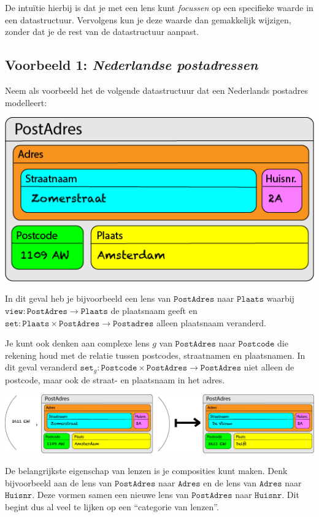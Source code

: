 \documentclass{article}
\newcommand{\PostAdres}[0]{\mathtt{PostAdres}}
\newcommand{\Adres}[0]{\mathtt{Adres}}
\newcommand{\Huisnr}[0]{\mathtt{Huisnr}}
\begin{document}
De intuïtie hierbij is dat je met een lens kunt \emph{focussen} op een specifieke waarde in een datastructuur. Vervolgens kun je deze waarde dan gemakkelijk wijzigen, zonder dat je de rest van de datastructuur aanpast.

\subsection*{Voorbeeld 1: \emph{Nederlandse postadressen}}

Neem als voorbeeld het de volgende datastructuur dat een Nederlands postadres modelleert:

\includegraphics[width=0.5\linewidth]{datamodel-postadres.png}

In dit geval heb je bijvoorbeeld een lens van $\mathtt{PostAdres}$ naar $\mathtt{Plaats}$ waarbij $\mathtt{view}: \mathtt{PostAdres} \to \mathtt{Plaats}$ de plaatsnaam geeft en $\mathtt{set}: \mathtt{Plaats} \times \mathtt{PostAdres} \to \mathtt{Postadres}$ alleen plaatsnaam veranderd.

Je kunt ook denken aan complexe lens $g$ van $\mathtt{PostAdres}$ naar $\mathtt{Postcode}$ die rekening houd met de relatie tussen postcodes, straatnamen en plaatsnamen. In dit geval veranderd $\mathtt{set}_g: \mathtt{Postcode} \times \mathtt{PostAdres} \to \mathtt{PostAdres}$ niet alleen de postcode, maar ook de straat- en plaatsnaam in het adres.

\vspace{12pt}

\noindent\includegraphics[width=\linewidth]{set-g.png}

\vspace{12pt}

De belangrijkste eigenschap van lenzen is je composities kunt maken. Denk bijvoorbeeld aan de lens van $\PostAdres$ naar $\Adres$ en de lens van $\Adres$ naar $\Huisnr$. Deze vormen samen een nieuwe lens van $\PostAdres$ naar $\Huisnr$. Dit begint dus al veel te lijken op een ``categorie van lenzen''.
\end{document}
